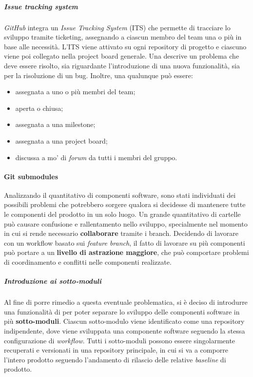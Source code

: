 		\subparagraph{Issue tracking system}

		\textit{GitHub} integra un \textit{Issue Tracking System} (ITS) che permette di tracciare lo sviluppo tramite ticketing, assegnando a ciascun membro del team una o più  in base alle necessità. L'ITS viene attivato su ogni repository di progetto e ciascuno viene poi collegato nella project board generale. Una  descrive un problema che deve essere risolto, sia riguardante l'introduzione di una nuova funzionalità, sia per la risoluzione di un bug. Inoltre, una qualunque  può essere:
		\begin{itemize}
			\item assegnata a uno o più membri del team;
			\item aperta o chiusa;
			\item assegnata a una milestone;
			\item assegnata a una project board;
			\item discussa a mo' di \textit{forum} da tutti i membri del gruppo.
		\end{itemize}


	\paragraph{Git submodules}

	Analizzando il quantitativo di componenti software, sono stati individuati dei possibili problemi che potrebbero sorgere qualora si decidesse di mantenere tutte le componenti del prodotto in un solo luogo. Un grande quantitativo di cartelle può causare confusione e rallentamento nello sviluppo, specialmente nel momento in cui si rende necessario \textbf{collaborare} tramite i branch. Decidendo di lavorare con un workflow basato sui \textit{feature branch}, il fatto di lavorare su più componenti può portare a un \textbf{livello di astrazione maggiore}, che può comportare problemi di coordinamento e conflitti nelle componenti realizzate.

		\subparagraph{Introduzione ai sotto-moduli}

		Al fine di porre rimedio a questa eventuale problematica, si è deciso di introdurre una funzionalità di  per poter separare lo sviluppo delle componenti software in più \textbf{sotto-moduli}. Ciascun sotto-modulo viene identificato come una repository indipendente, dove viene sviluppata una componente software seguendo la stessa configurazione di \textit{workflow}. 
		Tutti i sotto-moduli possono essere singolarmente recuperati e versionati in una repository principale, in cui si va a comporre l'intero prodotto seguendo l'andamento di rilascio delle relative \textit{baseline} di prodotto.

